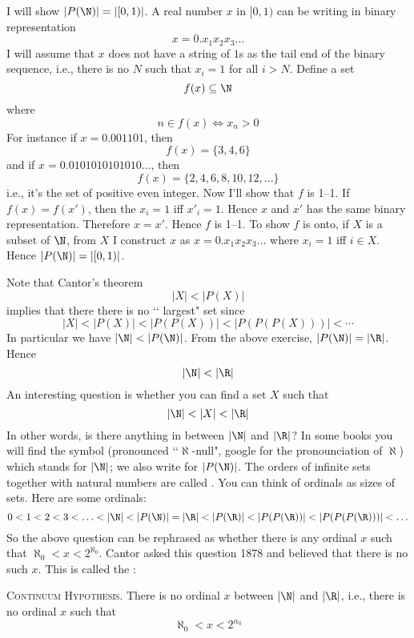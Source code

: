 \proof
I will show $|P(\N)| = |[0, 1)|$.
A real number $x$ in $[0, 1)$ can be writing in binary representation
  \[
  x = 0.x_1 x_2 x_3 \ldots
  \]
  I will assume that $x$ does not have a string of $1$s as the tail end
  of the binary sequence, i.e., there is no $N$ such that
  $x_i = 1$ for all $i > N$.
  Define
  a set
  \[
  f(x) \subseteq \N
  \]
  where
  \[
  n \in f(x) \iff x_n > 0
  \]
  For instance if $x = 0.001101$, then
  \[
  f(x) = \{3,4,6\}
  \]
  and if $x = 0.0101010101010\ldots$, then
  \[
  f(x) = \{2, 4, 6, 8,10, 12, ...\} 
  \]
  i.e., it's the set of positive even integer.
  Now I'll show that $f$ is 1--1.
  If $f(x) = f(x')$, then the
  $x_i = 1$ iff $x'_i = 1$.
  Hence $x$ and $x'$ has the same binary representation.
  Therefore $x = x'$.
  Hence $f$ is 1--1.
  To show $f$ is onto,
  if $X$ is a subset of $\N$, from $X$ I construct $x$ as
  $x = 0.x_1 x_2 x_3 \ldots$ where $x_i = 1$ iff $i \in X$.
  Hence $|P(\N)| = |[0,1)|$.

Note that Cantor's theorem
\[
|X| < |P(X)|
\]
implies that there there is no \lq\lq
largest" set since
\[
|X| < |P(X)| < |P(P(X))| < |P(P(P(X)))| < \cdots
\]
In particular we have $|\N| < |P(\N)|$.
From the above exercise, $|P(\N)| = |\R|$.
Hence
\[
|\N| < |\R|
\]
An interesting question is
whether you can find a set $X$ such that
\[
|\N| < |X| < |\R|
\]
In other words, is there anything in between $|\N|$ and $|\R|$?
In some books you will find the symbol
 (pronounced \lq\lq $\aleph$-null", google for the
pronounciation of $\aleph$)
which stands for
$|\N|$; we also write
\sidebarskip{12pt}\sidebarskip{0pt}
for $|P(\N)|$.
The orders of
infinite sets together with natural numbers are called
.
You can think of ordinals as sizes of sets.
Here are some ordinals:
\[
0 < 1 < 2 < 3 < \ldots < |\N| < |P(\N)| = |\R| < |P(\R)| < |P(P(\R))|
< |P(P(P(\R)))|
< \ldots
\]
So the
above question can be rephrased as whether there is any ordinal $x$
such that $\aleph_0 < x < 2^{\aleph_0}$.
Cantor asked this question 1878 and believed that there is no such $x$.
This is called the
\sidebarskip{12pt}\sidebarskip{0pt}:

\textsc{Continuum Hypothesis}.
There is no ordinal $x$ between $|\N|$ and $|\R|$, i.e.,
there is no ordinal $x$ such that
\[
\aleph_0 < x < 2^{\alpha_0}
\]

